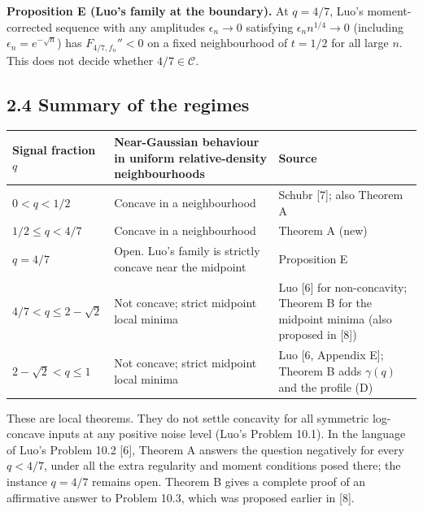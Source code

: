 \documentclass[
  british,
  10pt,
]{article}
\newcounter{none} %
\begin{document}
\textbf{Proposition E (Luo's family at the boundary).} At \(q=4/7\),
Luo's moment-corrected sequence with any amplitudes \(\epsilon_n\to0\)
satisfying \(\epsilon_nn^{1/4}\to0\) (including
\(\epsilon_n=e^{-\sqrt n}\)) has \(F_{4/7,f_n}''<0\) on a fixed
neighbourhood of \(t=1/2\) for all large \(n\). This does not decide
whether \(4/7\in\mathcal C\).

\subsection{2.4 Summary of the regimes}\label{summary-of-the-regimes}

{\def\LTcaptype{none} %
\begin{longtable}[]{@{}
  >{\raggedright\arraybackslash}p{}
  >{\raggedright\arraybackslash}p{}
  >{\raggedright\arraybackslash}p{}@{}}
\toprule\noalign{}
\begin{minipage}[b]{\linewidth}\raggedright
Signal fraction \(q\)
\end{minipage} & \begin{minipage}[b]{\linewidth}\raggedright
Near-Gaussian behaviour in uniform relative-density neighbourhoods
\end{minipage} & \begin{minipage}[b]{\linewidth}\raggedright
Source
\end{minipage} \\
\midrule\noalign{}
\endhead
\bottomrule\noalign{}
\endlastfoot
\(0<q<1/2\) & Concave in a neighbourhood & Schubr {[}7{]}; also Theorem
A \\
\(1/2\le q<4/7\) & Concave in a neighbourhood & Theorem A (new) \\
\(q=4/7\) & Open. Luo's family is strictly concave near the midpoint &
Proposition E \\
\(4/7<q\le2-\sqrt2\) & Not concave; strict midpoint local minima & Luo
{[}6{]} for non-concavity; Theorem B for the midpoint minima (also
proposed in {[}8{]}) \\
\(2-\sqrt2<q\le1\) & Not concave; strict midpoint local minima & Luo
{[}6, Appendix E{]}; Theorem B adds \(\gamma(q)\) and the profile (D) \\
\end{longtable}
}

These are local theorems. They do not settle concavity for all symmetric
log-concave inputs at any positive noise level (Luo's Problem 10.1). In
the language of Luo's Problem 10.2 {[}6{]}, Theorem A answers the
question negatively for every \(q<4/7\), under all the extra regularity
and moment conditions posed there; the instance \(q=4/7\) remains open.
Theorem B gives a complete proof of an affirmative answer to Problem
10.3, which was proposed earlier in {[}8{]}.
\end{document}
